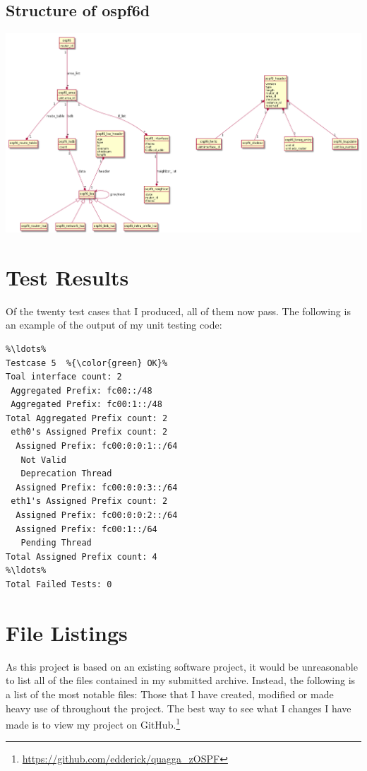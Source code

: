 \begin{landscape}
\chapter{Structure of ospf6d}
\label{ospf6d}
\begin{center}
  \includegraphics[width=0.9\linewidth]{../Diagrams/UML/quaggaOSPF6D/ospf6d_simple.png}
\end{center}

\end{landscape}

\chapter{Test Results}
\label{testResults}
Of the twenty test cases that I produced, all of them now pass. The following is an
example of the output of my unit testing code: 

\begin{lstlisting}
%\ldots%
Testcase 5  %{\color{green} OK}%
Toal interface count: 2 
 Aggregated Prefix: fc00::/48
 Aggregated Prefix: fc00:1::/48
Total Aggregated Prefix count: 2 
 eth0's Assigned Prefix count: 2
  Assigned Prefix: fc00:0:0:1::/64
   Not Valid
   Deprecation Thread
  Assigned Prefix: fc00:0:0:3::/64
 eth1's Assigned Prefix count: 2
  Assigned Prefix: fc00:0:0:2::/64
  Assigned Prefix: fc00:1::/64
   Pending Thread
Total Assigned Prefix count: 4 
%\ldots%
Total Failed Tests: 0
\end{lstlisting}

\chapter{File Listings}
As this project is based on an existing software project, it would be
unreasonable to list all of the files contained in my submitted archive.
Instead, the following is a list of the most notable files: Those that I have
created, modified or made heavy use of throughout the project. The best way to
see what I changes I have made is to view my project on
GitHub.\footnote{\url{https://github.com/edderick/quagga_zOSPF}}


